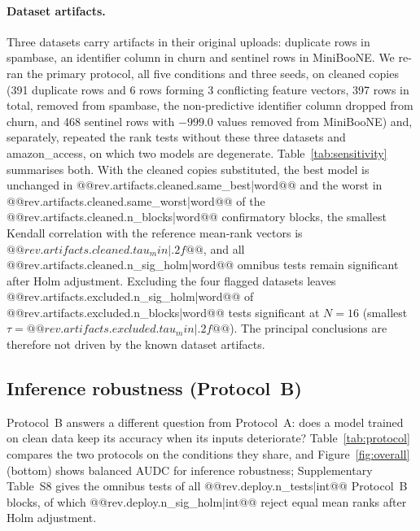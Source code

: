 \documentclass[pdflatex,sn-mathphys]{sn-jnl}
\theoremstyle{thmstyleone}
\theoremstyle{thmstyletwo}
\theoremstyle{thmstylethree}
\begin{document}
\paragraph{Dataset artifacts.} Three datasets carry artifacts in their original uploads: duplicate rows in spambase, an identifier column in churn and sentinel rows in MiniBooNE. We re-ran the primary protocol, all five conditions and three seeds, on cleaned copies (391 duplicate rows and 6 rows forming 3 conflicting feature vectors, 397 rows in total, removed from spambase, the non-predictive identifier column dropped from churn, and 468 sentinel rows with $-999.0$ values removed from MiniBooNE) and, separately, repeated the rank tests without these three datasets and amazon\_access, on which two models are degenerate. Table~\ref{tab:sensitivity} summarises both. With the cleaned copies substituted, the best model is unchanged in @@{rev.artifacts.cleaned.same_best|word}@@ and the worst in @@{rev.artifacts.cleaned.same_worst|word}@@ of the @@{rev.artifacts.cleaned.n_blocks|word}@@ confirmatory blocks, the smallest Kendall correlation with the reference mean-rank vectors is $@@{rev.artifacts.cleaned.tau_min|.2f}@@$, and all @@{rev.artifacts.cleaned.n_sig_holm|word}@@ omnibus tests remain significant after Holm adjustment. Excluding the four flagged datasets leaves @@{rev.artifacts.excluded.n_sig_holm|word}@@ of @@{rev.artifacts.excluded.n_blocks|word}@@ tests significant at $N=16$ (smallest $\tau=@@{rev.artifacts.excluded.tau_min|.2f}@@$). The principal conclusions are therefore not driven by the known dataset artifacts.




\subsection{Inference robustness (Protocol~B)}\label{sec:res:deploy}

Protocol~B answers a different question from Protocol~A: does a model trained on clean data keep its accuracy when its inputs deteriorate? Table~\ref{tab:protocol} compares the two protocols on the conditions they share, and Figure~\ref{fig:overall} (bottom) shows balanced AUDC for inference robustness; Supplementary Table~S8 gives the omnibus tests of all @@{rev.deploy.n_tests|int}@@ Protocol~B blocks, of which @@{rev.deploy.n_sig_holm|int}@@ reject equal mean ranks after Holm adjustment.


\end{document}
